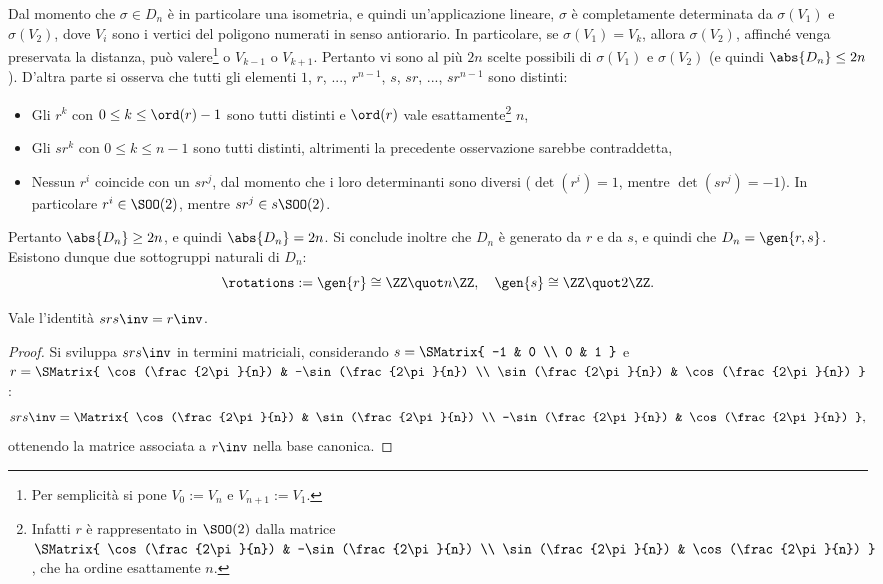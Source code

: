 \documentclass[12pt]{scrartcl}
\begin{document}
	
	Dal momento che $\sigma \in D_n$ è in particolare una isometria, e quindi
	un'applicazione lineare, $\sigma$ è completamente determinata da
	$\sigma(V_1)$ e $\sigma(V_2)$, dove $V_i$ sono i vertici del poligono numerati
	in senso antiorario. In particolare, se $\sigma(V_1) = V_k$, allora
	$\sigma(V_2)$, affinché venga preservata la distanza, può valere\footnote{
		Per semplicità si pone $V_0 := V_n$ e $V_{n+1} := V_1$.
	} o
	$V_{k-1}$ o $V_{k+1}$. Pertanto vi sono al più $2n$ scelte possibili di
	$\sigma(V_1)$ e $\sigma(V_2)$ (e quindi $\abs{D_n} \leq 2n$). D'altra parte
	si osserva che tutti gli elementi $1$, $r$, ..., $r^{n-1}$, $s$, $sr$, ..., $s r^{n-1}$
	sono distinti:
	\begin{itemize}
		\item Gli $r^k$ con $0 \leq k \leq \ord(r) - 1$ sono tutti distinti e $\ord(r)$ vale
			esattamente\footnote{
				Infatti $r$ è rappresentato in $\SOO(2)$ dalla matrice $\SMatrix{
					\cos(\frac{2\pi}{n}) & -\sin(\frac{2\pi}{n}) \\
					\sin(\frac{2\pi}{n}) & \cos(\frac{2\pi}{n})
				}$, che ha ordine esattamente $n$.
			} $n$,
		\item Gli $sr^k$ con $0 \leq k \leq n - 1$ sono tutti distinti, altrimenti
			la precedente osservazione sarebbe contraddetta,
		\item Nessun $r^i$ coincide con un $s r^j$, dal momento che i loro determinanti
			sono diversi ($\det(r^i) = 1$, mentre $\det(s r^j) = -1$). In particolare
			$r^i \in \SOO(2)$, mentre $s r^j \in s \SOO(2)$.
	\end{itemize}
	
	Pertanto $\abs{D_n} \geq 2n$, e quindi $\abs{D_n} = 2n$. Si conclude inoltre
	che $D_n$ è generato da $r$ e da $s$, e quindi che $D_n = \gen{r, s}$. Esistono
	dunque due sottogruppi naturali di $D_n$:
	\[ \rotations := \gen{r} \cong \ZZ \quot n\ZZ, \quad \gen{s} \cong \ZZ \quot 2\ZZ. \]
	
	
	\begin{proposition}
		Vale l'identità $s r s\inv = r\inv$.
	\end{proposition}

	\begin{proof}
		Si sviluppa $s r s\inv$ in termini matriciali, considerando
		$s = \SMatrix{
			-1 & 0 \\
			0 & 1
		}$ e $r = \SMatrix{
			\cos(\frac{2\pi}{n}) & -\sin(\frac{2\pi}{n}) \\
			\sin(\frac{2\pi}{n}) & \cos(\frac{2\pi}{n})
		}$:
		\[ s r s\inv = \Matrix{
			\cos(\frac{2\pi}{n}) & \sin(\frac{2\pi}{n}) \\
			-\sin(\frac{2\pi}{n}) & \cos(\frac{2\pi}{n})
		}, \]
		ottenendo la matrice associata a $r\inv$ nella base canonica.
	\end{proof}
	
\end{document}
